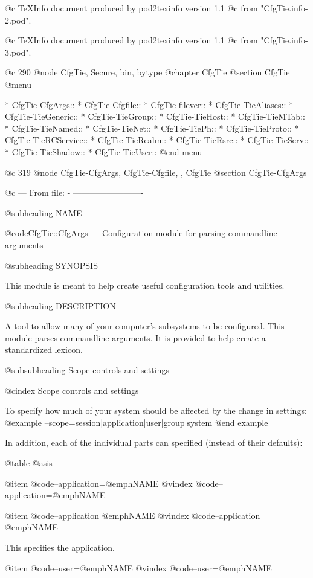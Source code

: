 @c TeXInfo document produced by pod2texinfo version 1.1
@c from "CfgTie.info-2.pod".


@c TeXInfo document produced by pod2texinfo version 1.1
@c from "CfgTie.info-3.pod".




@c 290
@node CfgTie, Secure, bin,  bytype
@chapter CfgTie
@section CfgTie 
@menu

* CfgTie-CfgArgs::
* CfgTie-Cfgfile::
* CfgTie-filever::
* CfgTie-TieAliases::
* CfgTie-TieGeneric::
* CfgTie-TieGroup::
* CfgTie-TieHost::
* CfgTie-TieMTab::
* CfgTie-TieNamed::
* CfgTie-TieNet::
* CfgTie-TiePh::
* CfgTie-TieProto::
* CfgTie-TieRCService::
* CfgTie-TieRealm::
* CfgTie-TieRsrc::
* CfgTie-TieServ::
* CfgTie-TieShadow::
* CfgTie-TieUser::
@end menu

@c 319
@node CfgTie-CfgArgs, CfgTie-Cfgfile,  , CfgTie
@section CfgTie-CfgArgs


@c --- From file: - -------------------------

@subheading NAME


@code{CfgTie::CfgArgs} --- Configuration module for parsing commandline arguments

@subheading SYNOPSIS

This module is meant to help create useful configuration tools and utilities.

@subheading DESCRIPTION

A tool to allow many of your computer's subsystems to be configured.  This
module parses commandline arguments.  It is provided to help create a
standardized lexicon.

@subsubheading Scope controls and settings

@cindex Scope controls and settings

To specify how much of your system should be affected by the change in
settings:
@example
  --scope=session|application|user|group|system
@end example

In addition, each of the individual parts can specified (instead of their
defaults):

@table @asis

@item @code{--application=}@emph{NAME}
@vindex @code{--application=}@emph{NAME}

@item @code{--application }@emph{NAME}
@vindex @code{--application }@emph{NAME}

This specifies the application.

@item @code{--user=}@emph{NAME}
@vindex @code{--user=}@emph{NAME}

